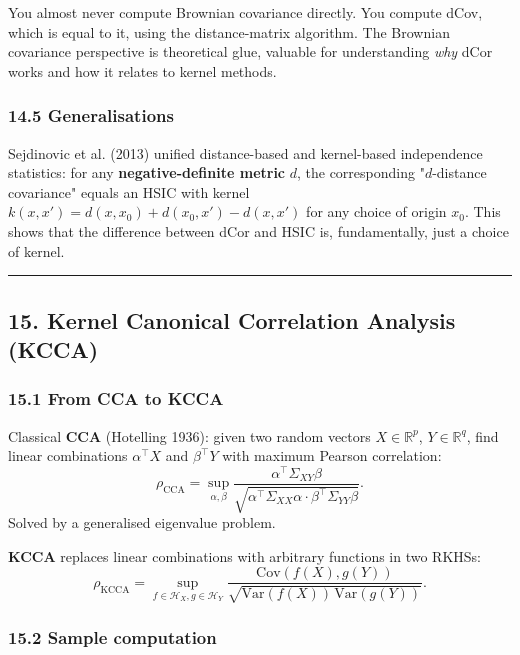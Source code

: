\documentclass{article}
\begin{document}
You almost never compute Brownian covariance directly. You compute dCov,
which is equal to it, using the distance-matrix algorithm. The Brownian
covariance perspective is theoretical glue, valuable for understanding
\emph{why} dCor works and how it relates to kernel methods.

\subsubsection{14.5 Generalisations}\label{145-generalisations}

Sejdinovic et al. (2013) unified distance-based and kernel-based
independence statistics: for any \textbf{negative-definite metric}
\(d\), the corresponding "\(d\)-distance covariance" equals an HSIC with
kernel \(k(x, x') = d(x, x_0) + d(x_0, x') - d(x, x')\) for any choice
of origin \(x_0\). This shows that the difference between dCor and HSIC
is, fundamentally, just a choice of kernel.

\begin{center}\rule{0.5\linewidth}{0.5pt}\end{center}

\subsection{15. Kernel Canonical Correlation Analysis
(KCCA)}\label{15-kernel-canonical-correlation-analysis-kcca}

\subsubsection{15.1 From CCA to KCCA}\label{151-from-cca-to-kcca}

Classical \textbf{CCA} (Hotelling 1936): given two random vectors
\(X \in \mathbb{R}^p\), \(Y \in \mathbb{R}^q\), find linear combinations
\(\alpha^\top X\) and \(\beta^\top Y\) with maximum Pearson correlation:
\[
\rho_{\text{CCA}} = \sup_{\alpha, \beta} \frac{\alpha^\top \Sigma_{XY} \beta}{\sqrt{\alpha^\top \Sigma_{XX} \alpha \cdot \beta^\top \Sigma_{YY} \beta}}.
\] Solved by a generalised eigenvalue problem.

\textbf{KCCA} replaces linear combinations with arbitrary functions in
two RKHSs: \[
\rho_{\text{KCCA}} = \sup_{f \in \mathcal{H}_X, g \in \mathcal{H}_Y} \frac{\mathrm{Cov}(f(X), g(Y))}{\sqrt{\mathrm{Var}(f(X))\, \mathrm{Var}(g(Y))}}.
\]

\subsubsection{15.2 Sample computation}\label{152-sample-computation}
\end{document}
